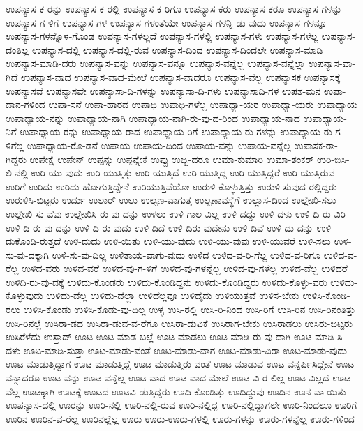 {ಉಪನ್ಯಾಸ-ಕ-ರನ್ನು
ಉಪನ್ಯಾಸ-ಕ-ರಲ್ಲಿ
ಉಪನ್ಯಾಸ-ಕ-ರಿಗೂ
ಉಪನ್ಯಾಸ-ಕರು
ಉಪನ್ಯಾಸ-ಕರೂ
ಉಪನ್ಯಾಸ-ಗಳನ್ನು
ಉಪನ್ಯಾಸ-ಗ-ಳಿಗೆ
ಉಪನ್ಯಾಸ-ಗಳ
ಉಪನ್ಯಾಸ-ಗಳಂತೆಯೇ
ಉಪನ್ಯಾಸ-ಗಳನ್ನಿ-ಡು-ವುದು
ಉಪನ್ಯಾಸ-ಗಳನ್ನೂ
ಉಪನ್ಯಾಸ-ಗಳನ್ನೊಳ-ಗೊಂಡ
ಉಪನ್ಯಾಸ-ಗಳಲ್ಲದೆ
ಉಪನ್ಯಾಸ-ಗಳಲ್ಲಿ
ಉಪನ್ಯಾಸ-ಗಳು
ಉಪನ್ಯಾಸ-ಗಳೆಲ್ಲ
ಉಪನ್ಯಾಸ-ದಂತಿಲ್ಲ
ಉಪನ್ಯಾಸ-ದಲ್ಲಿ
ಉಪನ್ಯಾಸ-ದಲ್ಲಿ-ರುವ
ಉಪನ್ಯಾಸ-ದಿಂದ
ಉಪನ್ಯಾಸ-ದಿಂದಲೇ
ಉಪನ್ಯಾಸ-ಮಾಡಿ
ಉಪನ್ಯಾಸ-ಮಾಡಿ-ದರು
ಉಪನ್ಯಾಸ-ವನ್ನು
ಉಪನ್ಯಾಸ-ವನ್ನೂ
ಉಪನ್ಯಾಸ-ವನ್ನೆಲ್ಲ
ಉಪನ್ಯಾಸ-ವನ್ನೆಲ್ಲಾ
ಉಪನ್ಯಾಸ-ವಾ-ಗಿದೆ
ಉಪನ್ಯಾಸ-ವಾದ
ಉಪನ್ಯಾಸ-ವಾದ-ಮೇಲೆ
ಉಪನ್ಯಾಸ-ವಾದರೂ
ಉಪನ್ಯಾಸ-ವೆಲ್ಲ
ಉಪನ್ಯಾಸಕ
ಉಪನ್ಯಾಸಕ್ಕೆ
ಉಪನ್ಯಾಸವೆ
ಉಪನ್ಯಾಸವೇ
ಉಪನ್ಯಾಸಾ-ದಿ-ಗಳನ್ನು
ಉಪನ್ಯಾಸಾ-ದಿ-ಗಳು
ಉಪನ್ಯಾಸಾದಿ-ಗಳ
ಉಪಶ-ಮನ
ಉಪಾ-ದಾನ-ಗಳಿಂದ
ಉಪಾ-ಸನೆ
ಉಪಾ-ಹಾರದ
ಉಪಾಧಿ
ಉಪಾಧಿ-ಗಳೆಲ್ಲ
ಉಪಾಧ್ಯಾ-ಯರ
ಉಪಾಧ್ಯಾ-ಯರು
ಉಪಾಧ್ಯಾಯ
ಉಪಾಧ್ಯಾಯ-ನನ್ನು
ಉಪಾಧ್ಯಾಯ-ನಾಗಿ
ಉಪಾಧ್ಯಾಯ-ನಾಗಿ-ರು-ವು-ದ-ರಿಂದ
ಉಪಾಧ್ಯಾಯ-ನಾದ
ಉಪಾಧ್ಯಾಯ-ನಿಗೆ
ಉಪಾಧ್ಯಾಯ-ರನ್ನು
ಉಪಾಧ್ಯಾಯ-ರಾದ
ಉಪಾಧ್ಯಾಯ-ರಿಗೆ
ಉಪಾಧ್ಯಾಯ-ರು-ಗಳನ್ನು
ಉಪಾಧ್ಯಾಯ-ರು-ಗ-ಳಿಗೆಲ್ಲ
ಉಪಾಧ್ಯಾಯ-ರೊ-ಡನೆ
ಉಪಾಯ
ಉಪಾಯ-ದಿಂದ
ಉಪಾಯ-ವನ್ನು
ಉಪಾಯ-ವನ್ನೆಲ್ಲ
ಉಪಾಸಕ-ರಾ-ಗಿದ್ದರು
ಉಪೇಕ್ಷೆ
ಉಪೇನ್
ಉಪ್ಪನ್ನು
ಉಪ್ಪನ್ನೇಕೆ
ಉಪ್ಪು
ಉಬ್ಬಿ-ದರೂ
ಉಮಾ-ಕುಮಾರಿ
ಉಮಾ-ಶಂಕರ್
ಉರಿ-ಬಿಸಿ-ಲಿ-ನಲ್ಲಿ
ಉರಿ-ಯು-ವುದು
ಉರಿ-ಯುತ್ತಿತ್ತು
ಉರಿ-ಯುತ್ತಿದೆ
ಉರಿ-ಯುತ್ತಿದ್ದ
ಉರಿ-ಯುತ್ತಿದ್ದರೆ
ಉರಿ-ಯುತ್ತಿರುವ
ಉರಿಗೆ
ಉರಿದು
ಉರಿದು-ಹೋಗುತ್ತಿದ್ದೇನೆ
ಉರಿಯುತ್ತಿವೆಯೋ
ಉರುಳಿ-ಕೊಳ್ಳುತ್ತಿತ್ತು
ಉರುಳಿ-ಸುವುದ-ರಲ್ಲಿದ್ದರು
ಉರುಳಿಸಿ-ಬಿಟ್ಟರು
ಉರ್ದು
ಉಲಾರ್
ಉಲು
ಉಲ್ಬಣ-ವಾಗುತ್ತ
ಉಲ್ಬಣಾವಸ್ಥೆಗೆ
ಉಲ್ಲಾಸ-ದಿಂದ
ಉಲ್ಲೇಖಿ-ಸಲು
ಉಲ್ಲೇಖಿ-ಸು-ವೆವು
ಉಲ್ಲೇಖಿಸಿ-ರು-ವು-ದನ್ನು
ಉಳಲು
ಉಳಿ-ಗಾಲ-ವಿಲ್ಲ
ಉಳಿ-ದದ್ದು
ಉಳಿ-ದಳು
ಉಳಿ-ದಿ-ರು-ವಿರಿ
ಉಳಿ-ದಿ-ರು-ವು-ದನ್ನು
ಉಳಿ-ದಿ-ರು-ವುದು
ಉಳಿ-ದಿದೆ
ಉಳಿ-ದಿರು-ವುದೇನು
ಉಳಿ-ದಿವೆ
ಉಳಿ-ದು-ದನ್ನು
ಉಳಿ-ದುಕೊಂಡಿ-ರುತ್ತದೆ
ಉಳಿ-ದುದು
ಉಳಿ-ಯಿತು
ಉಳಿ-ಯು-ವುದು
ಉಳಿ-ಯು-ವುವು
ಉಳಿ-ಯುವರೆ
ಉಳಿ-ಸಲು
ಉಳಿ-ಸು-ವು-ದಕ್ಕಾಗಿ
ಉಳಿ-ಸು-ವು-ದಿಲ್ಲ
ಉಳಿತಾಯ-ವಾಗು-ವುದು
ಉಳಿದ
ಉಳಿದ-ವ-ರಿ-ಗೆಲ್ಲ
ಉಳಿದ-ವ-ರಿಗೂ
ಉಳಿದ-ವ-ರೆಲ್ಲ
ಉಳಿದ-ವರು
ಉಳಿದ-ವರೆ
ಉಳಿದ-ವು-ಗ-ಳಿಗೆ
ಉಳಿದ-ವು-ಗಳನ್ನೆಲ್ಲ
ಉಳಿದ-ವು-ಗಳೆಲ್ಲ
ಉಳಿದ-ವೆಲ್ಲ
ಉಳಿದರೆ
ಉಳಿದಿ-ರು-ವು-ದಕ್ಕೆ
ಉಳಿದು-ಕೊಂಡರು
ಉಳಿದು-ಕೊಂಡಿದ್ದನು
ಉಳಿದು-ಕೊಂಡಿದ್ದರು
ಉಳಿದು-ಕೊಳ್ಳು-ವರು
ಉಳಿದು-ಕೊಳ್ಳುವುದು
ಉಳಿದು-ದೆಲ್ಲ
ಉಳಿದು-ದೆಲ್ಲಾ
ಉಳಿದೆಲ್ಲವೂ
ಉಳಿದೈದು
ಉಳಿಯುತ್ತವೆ
ಉಳಿಸ-ಬೇಕು
ಉಳಿಸಿ-ಕೊಂಡಿ-ರಲು
ಉಳಿಸಿ-ಕೊಂಡು
ಉಳಿಸಿ-ಕೊಡು-ವು-ದಿಲ್ಲ
ಉಳ್ಳ
ಉಸಿ-ರಲ್ಲಿ
ಉಸಿ-ರಿ-ನಿಂದ
ಉಸಿ-ರಿಗೆ
ಉಸಿ-ರಿನ
ಉಸಿ-ರಿನಂತಿತ್ತು
ಉಸಿ-ರಿನಲ್ಲೆ
ಉಸಿರಾ-ಡದ
ಉಸಿರಾ-ಡುವ-ವ-ರೆಗೂ
ಉಸಿರಾ-ಡುವಿಕೆ
ಉಸಿರಾಗ-ಬೇಕು
ಉಸಿರಾಡಲು
ಉಸಿರು-ಬಿಟ್ಟರು
ಉಸಿರೆಳೆದು
ಉಸ್ತಾದ್
ಊಟ
ಊಟ-ಮಾಡ-ಬಲ್ಲೆ
ಊಟ-ಮಾಡಲು
ಊಟ-ಮಾಡಿ-ರು-ವು-ದಾಗಿ
ಊಟ-ಮಾಡಿ-ಸಿ-ದಳು
ಊಟ-ಮಾಡಿ-ಸುತ್ತಾ
ಊಟ-ಮಾಡು-ವಂತೆ
ಊಟ-ಮಾಡು-ವಾಗ
ಊಟ-ಮಾಡು-ವಿರಾ
ಊಟ-ಮಾಡು-ವುದು
ಊಟ-ಮಾಡುತ್ತಿದ್ದಾಗ
ಊಟ-ಮಾಡುತ್ತಿದ್ದೆ
ಊಟ-ಮಾಡುತ್ತಿರು-ವಂತೆ
ಊಟ-ಮಾಡುವ
ಊಟ-ವನ್ನರ್ಪಿಸಿದ್ದೇನೆ
ಊಟ-ವನ್ನಾದರೂ
ಊಟ-ವನ್ನು
ಊಟ-ವನ್ನೆಲ್ಲ
ಊಟ-ವಾದ
ಊಟ-ವಾದ-ಮೇಲೆ
ಊಟ-ವಿ-ರ-ಲಿಲ್ಲ
ಊಟ-ವಿಲ್ಲದೆ
ಊಟ-ವೆಲ್ಲ
ಊಟಕ್ಕಾಗಿ
ಊಟಕ್ಕೆ
ಊಟದ
ಊಟವಿ-ಡುತ್ತಿದ್ದರು
ಊದಿ-ಕೊಂಡಿತ್ತು
ಊದಿದ್ದುವು
ಊದಿನ
ಊನ-ವಾ-ಯಿತು
ಊಪನ್ಯಾಸ-ದಲ್ಲಿ
ಊರನ್ನು
ಊರಿ-ನಲ್ಲಿ
ಊರಿ-ನಲ್ಲಿ-ರುವ
ಊರಿ-ನಲ್ಲಿದ್ದ
ಊರಿ-ನಲ್ಲಿದ್ದಾಗಲೇ
ಊರಿ-ನಿಂದಲೂ
ಊರಿಗೆ
ಊರಿನ
ಊರಿನ-ವ-ರೆಲ್ಲ
ಊರಿನಲ್ಲೆಲ್ಲ
ಊರು
ಊರು-ಊರು-ಗಳಲ್ಲಿ
ಊರು-ಗಳನ್ನು
ಊರು-ಗಳನ್ನೆಲ್ಲ
ಊರು-ಗಳಿಂದ
}
